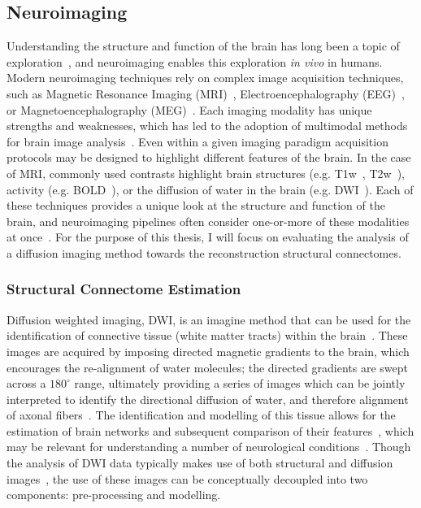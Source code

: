 \subsection{Neuroimaging}
Understanding the structure and function of the brain has long been a topic of
exploration~\cite{raichle2006brain}, and neuroimaging enables this exploration \textit{in vivo} in humans.
Modern neuroimaging techniques rely on complex image acquisition techniques, such as Magnetic Resonance Imaging
(MRI)~\cite{young1987magnetic}, Electroencephalography (EEG)~\cite{da2009eeg}, or Magnetoencephalography
(MEG)~\cite{baillet2017magnetoencephalography}. Each imaging modality has unique strengths and weaknesses, which has
led to the adoption of multimodal methods for brain image analysis~\cite{sui2012review,calhoun2006feature}. Even within
a given imaging paradigm acquisition protocols may be designed to highlight different features of the brain. In the
case of MRI, commonly used contrasts highlight brain structures (e.g. T1w~\cite{bergamino2014review},
T2w~\cite{chavhan2009principles}), activity (e.g. BOLD~\cite{logothetis2004nature}), or the diffusion of water in the
brain (e.g. DWI~\cite{bammer2003basic}). Each of these techniques provides a unique look at the structure and function
of the brain, and neuroimaging pipelines often consider one-or-more of these modalities at
once~\cite{esteban2019fmriprep,garyfallidis2014dipy}. For the purpose of this thesis, I will focus on evaluating the
analysis of a diffusion imaging method towards the reconstruction structural connectomes.

\subsubsection{Structural Connectome Estimation}

Diffusion weighted imaging, DWI, is an imagine method that can be used for the identification of connective tissue
(white matter tracts) within the brain~\cite{wandell2016clarifying,thomason2011diffusion}. These images are acquired by
imposing directed magnetic gradients to the brain, which encourages the re-alignment of water molecules; the directed
gradients are swept across a $180^{\circ}$ range, ultimately providing a series of images which can be jointly
interpreted to identify the directional diffusion of water, and therefore alignment of axonal
fibers~\cite{pinto2020harmonization}. The identification and modelling of this tissue allows for the estimation of
brain networks and subsequent comparison of their features~\cite{sporns2013human}, which may be relevant for
understanding a number of neurological
conditions~\cite{shah2017altered,yan2018rich,xie2012mapping,griffa2013structural}. Though the analysis of DWI data
typically makes use of both structural and diffusion images~\cite{jenkinson2012fsl,garyfallidis2014dipy}, the use of
these images can be conceptually decoupled into two components: pre-processing and modelling.

